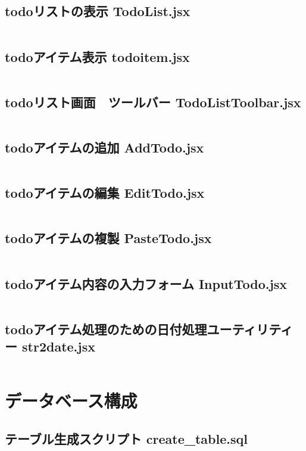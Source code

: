 \documentclass[paper=a4paper, fontsize=10pt, head_space=10mm, foot_space=17mm, gutter=17mm, line_length=185mm, twoside]{jlreq}
\begin{document}
\subsection {todoリストの表示 TodoList.jsx}
\inputminted[linenos, breaklines]{jsx}{src-react/TodoList.jsx}
\clearpage

\subsection {todoアイテム表示 todoitem.jsx}
\inputminted[linenos, breaklines]{jsx}{src-react/todoitem.jsx}
\clearpage

\subsection {todoリスト画面　ツールバー TodoListToolbar.jsx} 
\inputminted[linenos, breaklines]{jsx}{src-react/TodoListToolbar.jsx}
\clearpage

\subsection {todoアイテムの追加 AddTodo.jsx}
\inputminted[linenos, breaklines]{jsx}{src-react/AddTodo.jsx}
\clearpage

\subsection {todoアイテムの編集 EditTodo.jsx}
\inputminted[linenos, breaklines]{jsx}{src-react/EditTodo.jsx}
\clearpage

\subsection {todoアイテムの複製 PasteTodo.jsx}
\inputminted[linenos, breaklines]{jsx}{src-react/PasteTodo.jsx}
\clearpage

\subsection {todoアイテム内容の入力フォーム InputTodo.jsx}
\inputminted[linenos, breaklines]{jsx}{src-react/InputTodo.jsx}
\clearpage

\subsection {todoアイテム処理のための日付処理ユーティリティー str2date.jsx}
\inputminted[linenos, breaklines]{jsx}{src-react/str2date.jsx}
\clearpage

\section{データベース構成}
\subsection{テーブル生成スクリプト create\_table.sql}
\inputminted[linenos, breaklines]{sql}{mariadb/create_table.sql}
\clearpage
\end{document}
